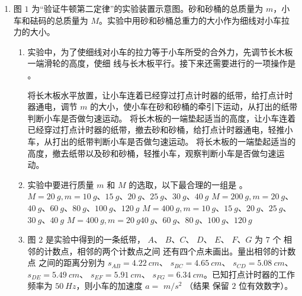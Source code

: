 \begin{enumerate}
\begin{enumerate}
\begin{enumerate}
\end{enumerate}


\end{enumerate}


\newpage
\item 
{}
图 $ 1 $ 为“验证牛顿第二定律”的实验装置示意图。砂和砂桶的总质量为 $ m $，小车和砝码的总质量为
$ M $。实验中用砂和砂桶总重力的大小作为细线对小车拉力的大小。
\begin{figure}[h!]
\centering

\end{figure}

\begin{enumerate}
\renewcommand{\labelenumi}{\arabic{enumi}.}
\item
实验中，为了使细线对小车的拉力等于小车所受的合外力，先调节长木板一端滑轮的高度，使细
线与长木板平行。接下来还需要进行的一项操作是  。 


\threechoices
{将长木板水平放置，让小车连着已经穿过打点计时器的纸带，给打点计时器通电，调节 $ m $ 的大小，使小车在砂和砂桶的牵引下运动，从打出的纸带判断小车是否做匀速运动。}
{将长木板的一端垫起适当的高度，让小车连着已经穿过打点计时器的纸带，撤去砂和砂桶，给打点计时器通电，轻推小车，从打出的纸带判断小车是否做匀速运动。}
{将长木板的一端垫起适当的高度，撤去纸带以及砂和砂桶，轻推小车，观察判断小车是否做匀速运动。}


\item 
实验中要进行质量 $ m $ 和 $ M $ 的选取，以下最合理的一组是 。 
\fourchoices
{$ M=20 \ g ,m=10 \ g $、$ 15 \ g $、$ 20 \ g $、$ 25 \ g $、$ 30 \ g $、$ 40 \ g $}
{$ M=200 \ g ,m=20 \ g $、$ 40 \ g $、$ 60 \ g $、$ 80 \ g $、$ 100 \ g $、$ 120 \ g $}
{$ M=400 \ g ,m=10 \ g $、$ 15 \ g $、$ 20 \ g $、$ 25 \ g $、$ 30 \ g $、$ 40 \ g $}
{$ M=400 \ g ,m=20 \ g 40 \ g $、$ 60 \ g $、$ 80 \ g $、$ 100 \ g $、$ 120 \ g $}

\item 
图 $ 2 $ 是实验中得到的一条纸带，
$ A $、 $ B $、$ C $、 $ D $、 $ E $、 $ F $、$ G $ 为 $ 7 $ 个
相邻的计数点，相邻的两个计数点之间
还有四个点未画出。量出相邻的计数点
之间的距离分别为 $ s_{AB}=4.22 \ cm $、 $ s_{BC}=4.65 \ cm $、 $ s_{CD}=5.08 \ cm $、 $ s_{DE}=5.49 \ cm $、 $ s_{EF}=5.91 \ cm $、
$ s_{FG}=6.34 \ cm $。已知打点计时器的工作频率为 $ 50 \ Hz $，则小车的加速度 $ a= $
$ m/s^{2} $ （结果
保留 $ 2 $ 位有效数字）。
\begin{figure}[h!]
\centering

\end{figure}



\end{enumerate}
\end{enumerate}
